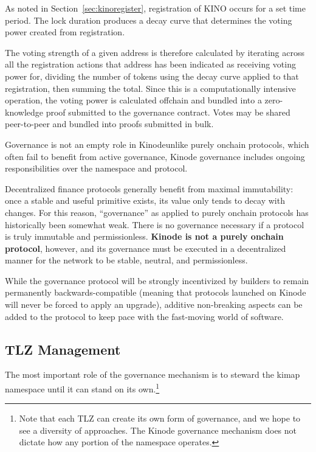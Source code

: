 \documentclass[runningheads]{llncs}
\begin{document}
As noted in Section~\ref{sec:kinoregister}, registration of KINO occurs for a set time period.
The lock duration produces a decay curve that determines the voting power created from registration.

The voting strength of a given address is therefore calculated by iterating across all the registration actions that address has been indicated as receiving voting power for, dividing the number of tokens using the decay curve applied to that registration, then summing the total.
Since this is a computationally intensive operation, the voting power is calculated offchain and bundled into a zero-knowledge proof submitted to the governance contract.
Votes may be shared peer-to-peer and bundled into proofs submitted in bulk.

Governance is not an empty role in Kinode\textemdash unlike purely onchain protocols, which often fail to benefit from active governance, Kinode governance includes ongoing responsibilities over the namespace and protocol.

Decentralized finance protocols generally benefit from maximal immutability: once a stable and useful primitive exists, its value only tends to decay with changes.
For this reason, ``governance'' as applied to purely onchain protocols has historically been somewhat weak.
There is no governance necessary if a protocol is truly immutable and permissionless. \textbf{Kinode is not a purely onchain protocol}, however, and its governance must be executed in a decentralized manner for the network to be stable, neutral, and permissionless.

While the governance protocol will be strongly incentivized by builders to remain permanently backwards-compatible (meaning that protocols launched on Kinode will never be forced to apply an upgrade), additive non-breaking aspects can be added to the protocol to keep pace with the fast-moving world of software.

\subsection{TLZ Management}
\label{sec:tlzmanagement}

The most important role of the governance mechanism is to steward the kimap namespace until it can stand on its own.\footnote{Note that each TLZ can create its own form of governance, and we hope to see a diversity of approaches. The Kinode governance mechanism does not dictate how any portion of the namespace operates.}
\end{document}
